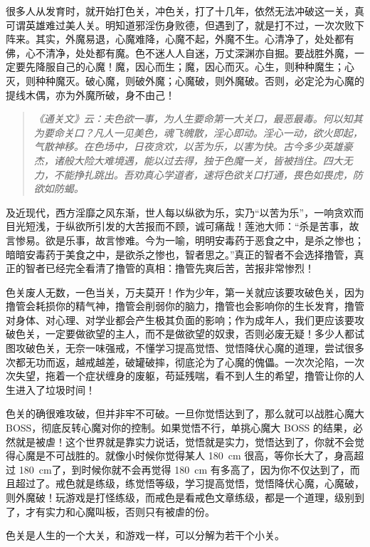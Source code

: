\documentclass{ctexart}
\begin{document}
很多人从发育时，就开始打色关，冲色关，打了十几年，依然无法冲破这一关，真可谓英雄难过美人关。明知道邪淫伤身败德，但遇到了，就是打不过，一次次败下阵来。其实，外魔易退，心魔难降，心魔不起，外魔不生。心清净了，处处都有佛，心不清净，处处都有魔。色不迷人人自迷，万丈深渊亦自掘。要战胜外魔，一定要先降服自己的心魔！魔，因心而生；魔，因心而灭。心生，则种种魔生；心灭，则种种魔灭。破心魔，则破外魔；心魔破，则外魔破。否则，必定沦为心魔的提线木偶，亦为外魔所破，身不由己！

\begin{quote}\it
    《通关文》云：夫色欲一事，为人生要命第一大关口，最恶最毒。何以知其为要命关口？凡人一见美色，魂飞魄散，淫心即动。淫心一动，欲火即起，气散神移。在色场中，日夜贪欢，以苦为乐，以害为快。古今多少英雄豪杰，诸般大险大难境遇，能以过去得，独于色魔一关，皆被挡住。四大无力，不能挣扎跳出。吾劝真心学道者，速将色欲关口打通，畏色如畏虎，防欲如防蝎。
\end{quote}

及近现代，西方淫靡之风东渐，世人每以纵欲为乐，实乃“以苦为乐”，一响贪欢而目光短浅，于纵欲所引发的大苦报而不顾，诚可痛哉！莲池大师：“杀是苦事，故言惨易。欲是乐事，故言惨难。今为一喻，明明安毒药于恶食之中，是杀之惨也；暗暗安毒药于美食之中，是欲杀之惨也，智者思之。”真正的智者不会选择撸管，真正的智者已经完全看清了撸管的真相：撸管先爽后苦，苦报非常惨烈！

色关废人无数，一色当关，万夫莫开！作为少年，第一关就应该要攻破色关，因为撸管会耗损你的精气神，撸管会削弱你的脑力，撸管也会影响你的生长发育，撸管对身体、对心理、对学业都会产生极其负面的影响；作为成年人，我们更应该要攻破色关，一定要做欲望的主人，而不是做欲望的奴隶，否则必废无疑！多少人都试图攻破色关，无奈一味强戒，不懂学习提高觉悟、觉悟降伏心魔的道理，尝试很多次都无功而返，越戒越差，破罐破摔，彻底沦为了心魔的傀儡。一次次沦陷，一次次失望，拖着一个症状缠身的废躯，苟延残喘，看不到人生的希望，撸管让你的人生进入了垃圾时间！

色关的确很难攻破，但并非牢不可破。一旦你觉悟达到了，那么就可以战胜心魔大 BOSS，彻底反转心魔对你的控制。如果觉悟不行，单挑心魔大 BOSS 的结果，必然就是被虐！这个世界就是靠实力说话，觉悟就是实力，觉悟达到了，你就不会觉得心魔是不可战胜的。就像小时候你觉得某人 \SI{180}{\centi\metre} 很高，等你长大了，身高超过 \SI{180}{\centi\metre}了，到时候你就不会再觉得 \SI{180}{\centi\metre} 有多高了，因为你不仅达到了，而且超过了。戒色就是练级，练觉悟等级，学习提高觉悟，觉悟降伏心魔，心魔破，则外魔破！玩游戏是打怪练级，而戒色是看戒色文章练级，都是一个道理，级别到了，才有实力和心魔叫板，否则只有被虐的份。

色关是人生的一个大关，和游戏一样，可以分解为若干个小关。
\end{document}
